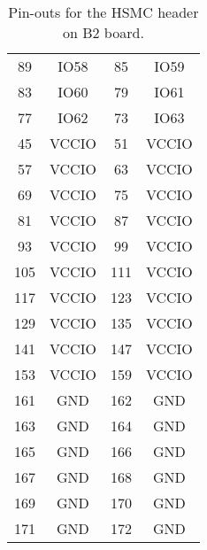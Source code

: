 \begin{table}[h]
\begin{tabular}{|c|c||c|c|}
89 & IO58 & 85 & IO59 \\
83 & IO60 & 79 & IO61 \\
77 & IO62 & 73 & IO63 \\
45 & VCCIO & 51 & VCCIO \\
57 & VCCIO & 63 & VCCIO \\
69 & VCCIO & 75 & VCCIO \\
81 & VCCIO & 87 & VCCIO \\
93 & VCCIO & 99 & VCCIO \\
105 & VCCIO & 111 & VCCIO \\
117 & VCCIO & 123 & VCCIO \\
129 & VCCIO & 135 & VCCIO \\
141 & VCCIO & 147 & VCCIO \\
153 & VCCIO & 159 & VCCIO \\
161 & GND & 162 & GND \\
163 & GND & 164 & GND \\
165 & GND & 166 & GND \\
167 & GND & 168 & GND \\
169 & GND & 170 & GND \\
171 & GND & 172 & GND \\
\end{tabular}
\caption{Pin-outs for the HSMC header on B2 board.}
\label{tab:b2_hsmc_pinout}
\end{table}


